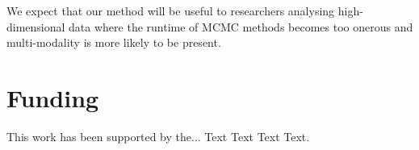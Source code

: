 \documentclass{bioinfo}
\begin{document}
We expect that our method will be useful to researchers analysing high-dimensional data where the runtime of MCMC methods becomes too onerous and multi-modality is more likely to be present.



%
%






%
%
%
%
%
%
%

\section*{Funding}

This work has been supported by the... Text Text  Text Text.\vspace*{-12pt}


%
%
%
%
%
%
%
%
  
\end{document}
